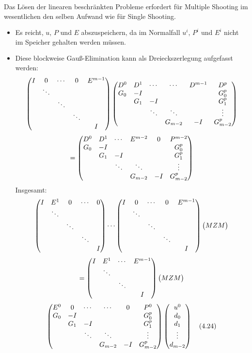 
Das Lösen der linearen beschränkten Probleme erfordert für Multiple Shooting im wesentlichen den selben Aufwand wie für Single Shooting.


\begin{itemize}
\item Es reicht, $u$, $P$ und $E$ abszuspeichern, da im Normalfall $u^i$, $P^i$ und $E^i$ nicht im Speicher gehalten werden müssen.
\item Diese blockweise Gauß-Elimination kann als Dreieckszerlegung aufgefasst werden:
\[ \begin{pmatrix} I & 0 & \cdots & 0 & E^{m-1} \\ & \ddots \\ & & \ddots \\ & & & \ddots \\ &&&&  I \end{pmatrix} \begin{pmatrix} D^0 & D^1 & \cdots & \cdots & D^{m-1} & D^p \\ G_0 & -I & && & G_0^p \\ & G_1 & -I & && G_1^p \\ & & \ddots & \ddots & & \vdots \\ & & & G_{m-2} & -I & G_{m-2}^p  \end{pmatrix} \]
\[ = \begin{pmatrix} D^0 & D^1 & \cdots & E^{m-2} & 0 & P^{m-2} \\ G_0 & -I & && & G_0^p \\ & G_1 & -I & && G_1^p \\ & & \ddots & \ddots & & \vdots \\ & & & G_{m-2} & -I & G_{m-2}^p \end{pmatrix} \]
Insgesamt:
\[ \begin{pmatrix} I & E^1 & 0 & \cdots & 0 \\ & \ddots \\ & & \ddots \\ & & & \ddots \\ &&&&  I \end{pmatrix} \cdots \begin{pmatrix} I & 0 & \cdots & 0 & E^{m-1} \\ & \ddots \\ & & \ddots \\ & & & \ddots \\ &&&&  I \end{pmatrix} \begin{pmatrix} MZM \end{pmatrix} \]
\[ = \begin{pmatrix} I & E^1 & \cdots & E^{m-1} \\ & \ddots \\ & & \ddots \\ &&&  I \end{pmatrix} \begin{pmatrix} MZM \end{pmatrix} \]
\[ \begin{pmatrix} E^0 & 0 & \cdots & \cdots & 0 & P^0 \\ G_0 & -I & && & G_0^p \\ & G_1 & -I & && G_1^p \\ & & \ddots & \ddots & & \vdots \\ & & & G_{m-2} & -I & G_{m-2}^p  \end{pmatrix} \begin{pmatrix} u^0 \\ d_0 \\ d_1 \\ \vdots \\ d_{m-2} \end{pmatrix} \quad (4.24) \]
\end{itemize}

